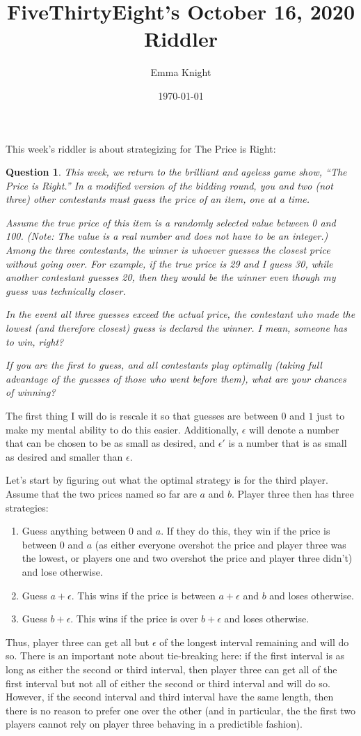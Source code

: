 \documentclass[11pt]{article}
\title{FiveThirtyEight's October 16, 2020 Riddler}
\author{Emma Knight}
\date{\today}
\newtheorem{question}[theorem]{Question}
\theoremstyle{definition}
\begin{document}
\maketitle
This week's riddler is about strategizing for The Price is Right:
\begin{question}
This week, we return to the brilliant and ageless game show, “The Price is Right.” In a modified version of the bidding round, you and two (not three) other contestants must guess the price of an item, one at a time.

Assume the true price of this item is a randomly selected value between 0 and 100. (Note: The value is a real number and does not have to be an integer.) Among the three contestants, the winner is whoever guesses the closest price without going over. For example, if the true price is 29 and I guess 30, while another contestant guesses 20, then they would be the winner even though my guess was technically closer.

In the event all three guesses exceed the actual price, the contestant who made the lowest (and therefore closest) guess is declared the winner. I mean, someone has to win, right?

If you are the first to guess, and all contestants play optimally (taking full advantage of the guesses of those who went before them), what are your chances of winning?
\end{question}
The first thing I will do is rescale it so that guesses are between $0$ and $1$ just to make my mental ability to do this easier.  Additionally, $\epsilon$ will denote a number that can be chosen to be as small as desired, and $\epsilon'$ is a number that is as small as desired and smaller than $\epsilon$.

Let's start by figuring out what the optimal strategy is for the third player.  Assume that the two prices named so far are $a$ and $b$.  Player three then has three strategies:
\begin{enumerate}
\item Guess anything between $0$ and $a$.  If they do this, they win if the price is between $0$ and $a$ (as either everyone overshot the price and player three was the lowest, or players one and two overshot the price and player three didn't) and lose otherwise.
\item Guess $a+\epsilon$.  This wins if the price is between $a+\epsilon$ and $b$ and loses otherwise.
\item Guess $b+\epsilon$.  This wins if the price is over $b+\epsilon$ and loses otherwise.
\end{enumerate}
Thus, player three can get all but $\epsilon$ of the longest interval remaining and will do so.  There is an important note about tie-breaking here: if the first interval is as long as either the second or third interval, then player three can get all of the first interval but not all of either the second or third interval and will do so.  However, if the second interval and third interval have the same length, then there is no reason to prefer one over the other (and in particular, the the first two players cannot rely on player three behaving in a predictible fashion).
\end{document}
